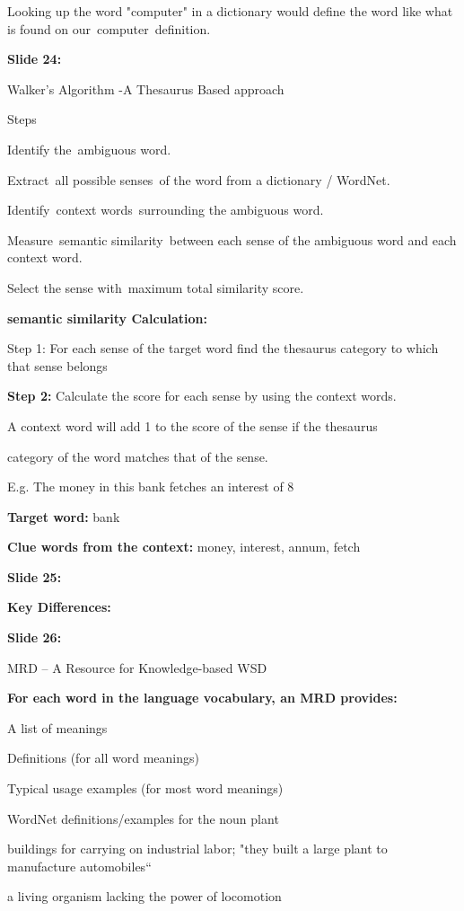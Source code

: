 \documentclass[11pt,a4paper]{article}
\begin{document}
Looking up the word "computer" in a dictionary would define the word like what is found on our computer definition.

\textbf{Slide 24:}

Walker’s Algorithm -A Thesaurus Based approach

Steps

Identify the ambiguous word.

Extract all possible senses of the word from a dictionary / WordNet.

Identify context words surrounding the ambiguous word.

Measure semantic similarity between each sense of the ambiguous word and each context word.

Select the sense with maximum total similarity score.

\textbf{semantic similarity Calculation:} 

Step 1: For each sense of the target word find the thesaurus category to which that sense belongs

\textbf{Step 2:}  Calculate the score for each sense by using the context words.

A context word will add 1 to the score of the sense if the thesaurus

category of the word matches that of the sense.

E.g. The money in this bank fetches an interest of 8%

\textbf{Target word:}  bank

\textbf{Clue words from the context:}  money, interest, annum, fetch

\textbf{Slide 25:}

\textbf{Key Differences:} 

\textbf{Slide 26:}

MRD – A Resource for Knowledge-based WSD

\textbf{For each word in the language vocabulary, an MRD provides:} 

A list of meanings

Definitions (for all word meanings)

Typical usage examples (for most word meanings)

WordNet definitions/examples for the noun plant

buildings for carrying on industrial labor; "they built a large plant to  manufacture automobiles“

a living organism lacking the power of locomotion
\end{document}
